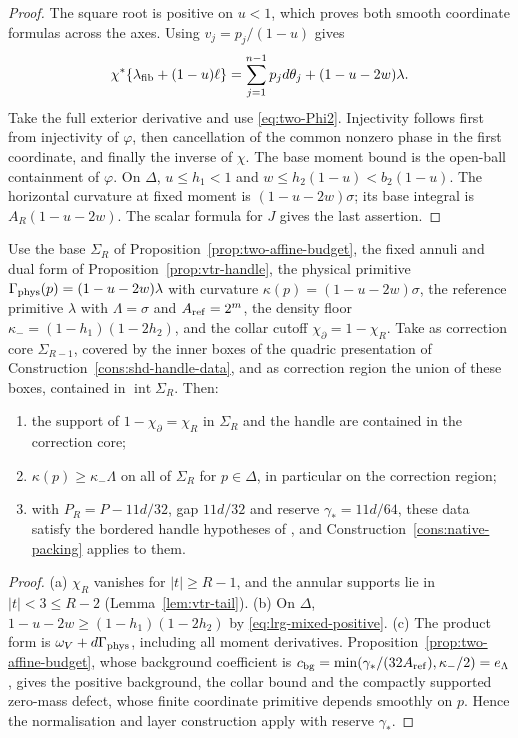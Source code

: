 \begin{proof}
The square root is positive on $u<1$, which proves both smooth coordinate formulas across the axes.
Using $v_j=p_j/(1-u)$ gives
\[
 \chi^*\{\lambda_{\rm fib}+(1-u)\ell\}
 =\sum_{j=1}^{n-1}p_jd\theta_j+(1-u-2w)\lambda.
\]
Take the full exterior derivative and use \eqref{eq:two-Phi2}.
Injectivity follows first from injectivity of $\varphi$, then cancellation of the common nonzero phase in the first
coordinate, and finally the inverse of $\chi$. The base moment bound is the open-ball containment of $\varphi$.
On $\Delta$, $u\le h_1<1$ and $w\le h_2(1-u)<b_2(1-u)$.
The horizontal curvature at fixed moment is $(1-u-2w)\sigma$; its base integral is $A_R(1-u-2w)$. The scalar formula for $J$ gives the last assertion.
\end{proof}



\begin{proposition}\label{prop:two-handle}
Use the base $\Sigma_R$ of Proposition~\ref{prop:two-affine-budget}, the fixed annuli and dual form of
Proposition~\ref{prop:vtr-handle}, the physical primitive $\Gamma_{\rm phys}(p)=(1-u-2w)\lambda$ with curvature
$\kappa(p)=(1-u-2w)\sigma$, the reference primitive $\lambda$ with $\Lambda=\sigma$ and $A_{\rm ref}=2^m$, the density floor
$\kappa_-=(1-h_1)(1-2h_2)$, and the collar cutoff $\chi_\partial=1-\chi_R$. Take as correction core $\Sigma_{R-1}$, covered by
the inner boxes of the quadric presentation of Construction~\ref{cons:shd-handle-data}, and as correction region the
union of these boxes, contained in $\operatorname{int}\Sigma_R$. Then:
\begin{enumerate}[label=(\alph*)]
\item the support of $1-\chi_\partial=\chi_R$ in $\Sigma_R$ and the handle are contained in the correction core;
\item $\kappa(p)\ge\kappa_-\Lambda$ on all of $\Sigma_R$ for $p\in\Delta$, in particular on the correction region;
\item with $P_R=P-11d/32$, gap $11d/32$ and reserve $\gamma_*=11d/64$, these data satisfy the bordered handle hypotheses
 of , and Construction~\ref{cons:native-packing} applies to them.
\end{enumerate}
\end{proposition}

\begin{proof}
(a) $\chi_R$ vanishes for $|t|\ge R-1$, and the annular supports lie in $|t|<3\le R-2$ (Lemma~\ref{lem:vtr-tail}).
(b) On $\Delta$, $1-u-2w\ge(1-h_1)(1-2h_2)$ by \eqref{eq:lrg-mixed-positive}. (c) The product form is
$\omega_V+d\Gamma_{\rm phys}$, including all moment derivatives. Proposition~\ref{prop:two-affine-budget}, whose background
coefficient is $c_{\rm bg}=\min(\gamma_*/(32A_{\rm ref}),\kappa_-/2)=e_\Lambda$, gives the positive background, the collar bound
and the compactly supported zero-mass defect, whose finite coordinate primitive depends smoothly on $p$. Hence the
normalisation and layer construction apply with reserve $\gamma_*$.
\end{proof}

